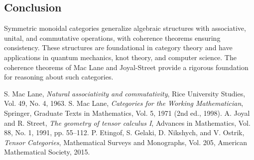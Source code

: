 \documentclass{article}
\begin{document}
\subsection{Conclusion}

Symmetric monoidal categories generalize algebraic structures with associative, unital, and commutative operations, with coherence theorems ensuring consistency. These structures are foundational in category theory and have applications in quantum mechanics, knot theory, and computer science. The coherence theorems of Mac Lane and Joyal-Street provide a rigorous foundation for reasoning about such categories.

\begin{thebibliography}{9}

 S. Mac Lane, \emph{Natural associativity and commutativity}, Rice University Studies, Vol. 49, No. 4, 1963.
 S. Mac Lane, \emph{Categories for the Working Mathematician}, Springer, Graduate Texts in Mathematics, Vol. 5, 1971 (2nd ed., 1998).
 A. Joyal and R. Street, \emph{The geometry of tensor calculus I}, Advances in Mathematics, Vol. 88, No. 1, 1991, pp. 55--112.
 P. Etingof, S. Gelaki, D. Nikshych, and V. Ostrik, \emph{Tensor Categories}, Mathematical Surveys and Monographs, Vol. 205, American Mathematical Society, 2015.

\end{thebibliography}
\end{document}
